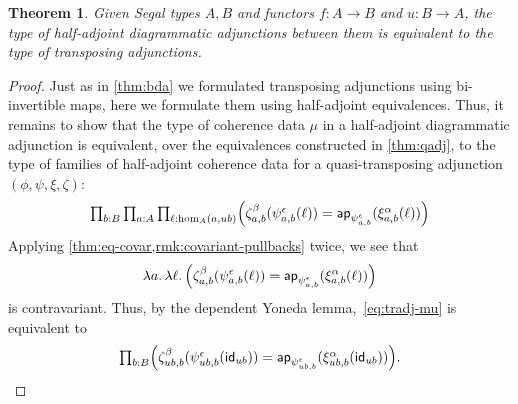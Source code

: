\documentclass[12pt]{amsart}
\theoremstyle{plain}
\newtheorem{thm}{Theorem}[section]
\theoremstyle{definition}
\theoremstyle{remark}
\numberwithin{equation}{section}
\newcommand{\tprod}{\textstyle\prod}
\newcommand{\lam}[1]{\lambda #1.\,}
\newcommand{\idarr}[1]{\mathsf{id}_{#1}}
\newcommand{\ap}{\mathsf{ap}}                             %
\newcommand{\Parens}[1]{\Bigl(#1\Bigr)}
\begin{document}
\begin{thm}\label{thm:haa}
  Given Segal types $A,B$ and functors $f:A\to B$ and $u:B\to A$, the type of half-adjoint diagrammatic adjunctions between them is equivalent to the type of transposing adjunctions.
\end{thm}
\begin{proof}
Just as in \cref{thm:bda} we formulated transposing adjunctions using bi-invertible maps, here we formulate them using half-adjoint equivalences.
  Thus, it remains to show that the type of coherence data $\mu$ in a half-adjoint diagrammatic adjunction is equivalent, over the equivalences constructed in \cref{thm:qadj}, to the type of families of half-adjoint coherence data for a quasi-transposing adjunction $(\phi,\psi,\xi,\zeta)$:
  \begin{equation}
    \tprod_{b:B} \tprod_{a:A} \tprod_{\ell:\hom_A(a,ub)}
    \Parens{\zeta^\beta_{a,b}(\psi^{\epsilon}_{a,b}(\ell)) = \ap_{\psi^\epsilon_{a,b}}(\xi^{\alpha}_{a,b}(\ell))}\label{eq:tradj-mu}
  \end{equation}
  Applying \cref{thm:eq-covar,rmk:covariant-pullbacks} twice, we see that
  \[\lam{a}\lam{\ell} \Parens{\zeta^\beta_{a,b}(\psi^\epsilon_{a,b}(\ell)) = \ap_{\psi^\epsilon_{a,b}}(\xi^\alpha_{a,b}(\ell))}\]
  is contravariant.
  Thus, by the dependent Yoneda lemma,~\eqref{eq:tradj-mu} is equivalent to
  \begin{equation}
    \tprod_{b:B} \Parens{\zeta^\beta_{ub,b}(\psi^\epsilon_{ub,b}(\idarr{ub}))
      = \ap_{\psi^\epsilon_{ub,b}}(\xi^\alpha_{ub,b}(\idarr{ub}))}.\label{eq:tradj-mu2}
  \end{equation}


\end{proof}
\end{document}
